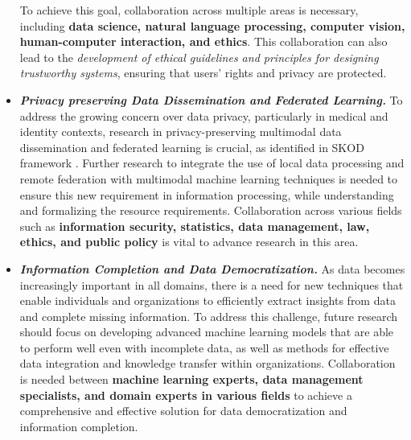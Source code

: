 \begin{itemize}[leftmargin=0pt, topsep=0pt,itemsep=0em]
To achieve this goal, collaboration across multiple areas is necessary, including\textbf{ data science, 
natural language processing, computer vision,  human-computer interaction, and ethics}. 
This collaboration can also lead to the \textit{development of ethical guidelines and principles for designing trustworthy systems}, ensuring that users' rights and privacy are protected.
\item \textbf{\textit{Privacy preserving Data Dissemination and Federated Learning.}}
To address the growing concern over data privacy, particularly in medical and identity contexts, research in privacy-preserving multimodal data dissemination and federated learning is crucial, as identified in SKOD framework \cite{palacios2019wip}. Further research to integrate the use of local data processing and remote federation with multimodal machine learning techniques is needed to ensure this new requirement in information processing, while understanding and formalizing the resource requirements. 
Collaboration across various fields such as \textbf{information security, statistics, data management, law, ethics, and public policy} is vital to advance research in this area.



\item \textbf{\textit{Information Completion and Data Democratization.}}
As data becomes increasingly important in all domains, there is a need for new techniques that enable individuals and organizations to efficiently extract insights from data and complete missing information. To address this challenge, future research should focus on developing advanced machine learning models that are able to perform well even with incomplete data, as well as methods for effective data integration and knowledge transfer within organizations. Collaboration is needed between \textbf{machine learning experts, data management specialists, and domain experts in various fields} to achieve a comprehensive and effective solution for data democratization and information completion.

\end{itemize}

